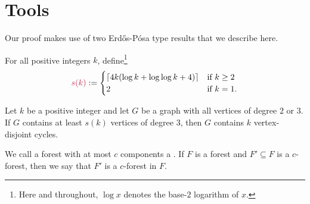 \documentclass{patmorin}
\newcommand{\pat}[1]{\textcolor{Blue}{[Pat: #1]}}
\newcommand{\gwen}[1]{\textcolor{Purple}{Gwen: #1}}
\newcommand{\piotr}[1]{\textcolor{red}{Piotr: #1}}
\begin{document}




\section{Tools}

Our proof makes use of two Erd\H{o}s-Pósa type results that we describe here.

For all positive integers $k$, define\footnote{Here and throughout, $\log x$ denotes the base-$2$ logarithm of $x$.}
\[
\mathdefin{s(k)}:=\begin{cases}
\lceil 4k(\log k + \log\log k +4)\rceil&\textrm{if $k\geq2$}\\
2&\textrm{if $k=1$.}
\end{cases}
\]


\begin{thm}
\label{thm:simonovits}
Let $k$ be a positive integer and
let $G$ be a graph with all vertices of degree $2$ or $3$.
If $G$ contains at least $s(k)$ vertices of degree $3$, then
$G$ contains $k$ vertex-disjoint cycles.
\end{thm}

We call a forest with at most $c$ components a . If $F$ is a forest and $F'\subseteq F$ is a $c$-forest, then we say that $F'$ is a $c$-forest  in $F$.


\end{document}
